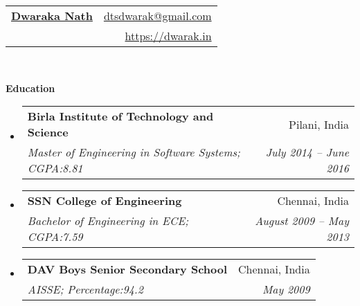 \documentclass[letterpaper,11pt]{article}
\makeatletter
\newcommand{\resheading}[1]{{\large \colorbox{mygrey}{\begin{minipage}{\textwidth}{\textbf{#1 \vphantom{p\^{E}}}}\end{minipage}}}}
\newcommand{\ressubheading}[4]{
\begin{tabular*}{6.5in}{l@{\extracolsep{\fill}}r}
		\textbf{#1} & #2 \\
		\textit{#3} & \textit{#4} \\
\end{tabular*}\vspace{-6pt}}
\makeatother
\begin{document}
\newcommand{\mywebheader}{
\begin{tabular*}{7in}{l@{\extracolsep{\fill}}r}
	\textbf{\href{https://dwarak.in/}{\Huge Dwaraka Nath}} & \href{mailto:dtsdwarak@gmail.com}{dtsdwarak@gmail.com}\\
	{} & \href{https://dwarak.in}{https://dwarak.in} \\
	\end{tabular*}
\\
\vspace{0.3in}}

\mywebheader

\resheading{Education}
	\begin{itemize}
		\item
			\ressubheading{{Birla Institute of Technology and Science}}{Pilani, India}{{Master of Engineering in Software Systems};{ CGPA:8.81}}{July 2014 -- June 2016}
		\item
			\ressubheading{{SSN College of Engineering}}{Chennai, India}{{Bachelor of Engineering in ECE};{ CGPA:7.59}}{August 2009 -- May 2013}
		\item
			\ressubheading{{DAV Boys Senior Secondary School}}{Chennai, India}{{AISSE};{ Percentage:94.2}}{May 2009}			
	\end{itemize} %
\end{document}
